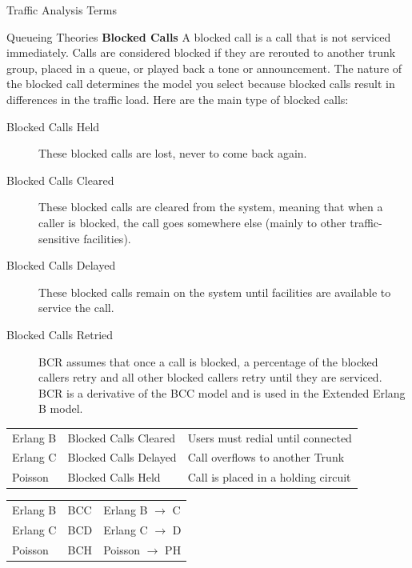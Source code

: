\documentclass[landscape,fontscale=1,margin=0.2cm,paperwidth=70truecm, paperheight=40truecm,debug]{baposter}
\begin{document}
\begin{poster}
\begin{posterbox}[column=0]{Traffic Analysis Terms}
\begin{description}
\end{description}
\end{posterbox}

\begin{posterbox}[column=0,below=auto,textborder=rounded]{Queueing Theories}
\textbf{Blocked Calls} A blocked call is a call that is not serviced immediately. Calls are considered blocked if they are rerouted to another trunk group, placed in a queue, or played back a tone or announcement. The nature of the blocked call determines the model you select because blocked calls result in differences in the traffic load. Here are the main type of blocked calls:
\begin{description}
\item[Blocked Calls Held] These blocked calls are lost, never to come back again. 
\item[Blocked Calls Cleared] These blocked calls are cleared from the system, meaning that when a caller is blocked, the call goes somewhere else (mainly to other traffic-sensitive facilities).
\item[Blocked Calls Delayed] These blocked calls remain on the system until facilities are available to service the call.
\item[Blocked Calls Retried] BCR assumes that once a call is blocked, a percentage of the blocked callers retry and all other blocked callers retry until they are serviced. BCR is a derivative of the BCC model and is used in the Extended Erlang B model.
\end{description}
\begin{center}
\begin{tabular}{lll}
Erlang B & Blocked Calls Cleared & Users must redial until connected\\
Erlang C & Blocked Calls Delayed & Call overflows to another Trunk\\
Poisson & Blocked Calls Held & Call is placed in a holding circuit\\
\end{tabular}
\begin{tabular}{lll}
Erlang B & BCC & Erlang B $\rightarrow$ C \\
Erlang C & BCD & Erlang C $\rightarrow$ D \\
Poisson & BCH & Poisson $\rightarrow$ PH\\
\end{tabular}

\end{center}
\end{posterbox}


\end{poster}
\end{document}
